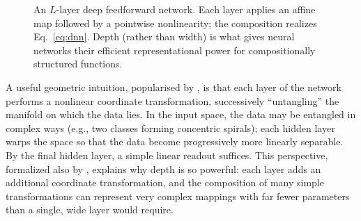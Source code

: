 \documentclass[11pt,a4paper]{report}
\newcommand{\y}{\bm{y}}
\begin{document}
\begin{figure}[ht]
\centering
{}
\caption{An $L$-layer deep feedforward network.  Each layer applies an affine map followed by a pointwise nonlinearity; the composition realizes Eq.~\eqref{eq:dnn}.  Depth (rather than width) is what gives neural networks their efficient representational power for compositionally structured functions.}
\label{fig:deep_ff_net}
\end{figure}

A useful geometric intuition, popularised by \citet{chollet2017deeplearning}, is that each layer of the network performs a nonlinear coordinate transformation, successively ``untangling'' the manifold on which the data lies.  In the input space, the data may be entangled in complex ways (e.g., two classes forming concentric spirals); each hidden layer warps the space so that the data become progressively more linearly separable.  By the final hidden layer, a simple linear readout suffices.  This perspective, formalized also by \citet{goodfellow2016deep}, explains why depth is so powerful: each layer adds an additional coordinate transformation, and the composition of many simple transformations can represent very complex mappings with far fewer parameters than a single, wide layer would require.
\end{document}

